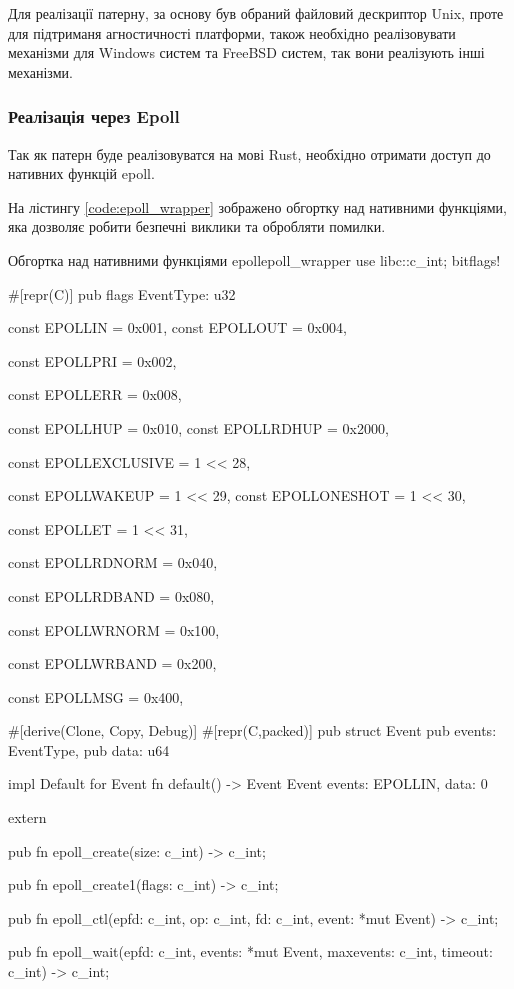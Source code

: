 \documentclass{lib/styles/default-style}
\begin{document}
    Для реалізації патерну, за основу був обраний файловий дескриптор Unix, проте для підтриманя агностичності платформи, також необхідно
    реалізовувати механізми для Windows систем та FreeBSD систем, так вони реалізують інші механізми.

    \subsubsection{Реалізація через Epoll}

    Так як патерн буде реалізовуватся на мові Rust, необхідно отримати доступ до нативних функцій epoll.

    На лістингу \ref{code:epoll_wrapper} зображено обгортку над нативними функціями, яка дозволяє робити безпечні виклики та обробляти помилки.
    
    \begin{code}{Обгортка над нативними функціями epoll}{epoll_wrapper}
    use libc::c_int;
    bitflags! {

        #[repr(C)]
        pub flags EventType: u32 {
            const EPOLLIN = 0x001,
            const EPOLLOUT = 0x004,

            const EPOLLPRI = 0x002,

            const EPOLLERR = 0x008,

            const EPOLLHUP = 0x010,
            const EPOLLRDHUP = 0x2000,

            const EPOLLEXCLUSIVE = 1 << 28,

            const EPOLLWAKEUP = 1 << 29,
            const EPOLLONESHOT = 1 << 30,

            const EPOLLET = 1 << 31,

            const EPOLLRDNORM = 0x040,

            const EPOLLRDBAND = 0x080,

            const EPOLLWRNORM = 0x100,

            const EPOLLWRBAND = 0x200,

            const EPOLLMSG = 0x400,
        }
    }   

    #[derive(Clone, Copy, Debug)]
    #[repr(C,packed)]
    pub struct Event {
        pub events: EventType,
        pub data: u64
    }

    impl Default for Event {
        fn default() -> Event {
            Event { events: EPOLLIN, data: 0 }
        }
    }

    extern {
    pub fn epoll_create(size: c_int) -> c_int;

    pub fn epoll_create1(flags: c_int) -> c_int;

    pub fn epoll_ctl(epfd: c_int,
                    op: c_int,
                    fd: c_int,
                    event: *mut Event) -> c_int;

    pub fn epoll_wait(epfd: c_int,
                    events: *mut Event,
                    maxevents: c_int,
                    timeout: c_int) -> c_int;
    }\end{code}
\end{document}
